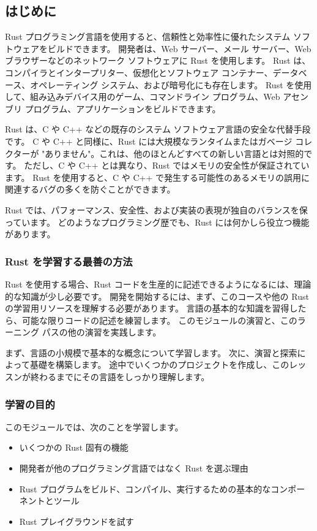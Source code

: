 \subsection{はじめに}

Rust プログラミング言語を使用すると、信頼性と効率性に優れたシステム ソフトウェアをビルドできます。 開発者は、Web サーバー、メール サーバー、Web ブラウザーなどのネットワーク ソフトウェアに Rust を使用します。 Rust は、コンパイラとインタープリター、仮想化とソフトウェア コンテナー、データベース、オペレーティング システム、および暗号化にも存在します。 Rust を使用して、組み込みデバイス用のゲーム、コマンドライン プログラム、Web アセンブリ プログラム、アプリケーションをビルドできます。

Rust は、C や C++ などの既存のシステム ソフトウェア言語の安全な代替手段です。 C や C++ と同様に、Rust には大規模なランタイムまたはガベージ コレクターが "ありません"。これは、他のほとんどすべての新しい言語とは対照的です。 ただし、C や C++ とは異なり、Rust ではメモリの安全性が保証されています。 Rust を使用すると、C や C++ で発生する可能性のあるメモリの誤用に関連するバグの多くを防ぐことができます。

Rust では、パフォーマンス、安全性、および実装の表現が独自のバランスを保っています。 どのようなプログラミング歴でも、Rust には何かしら役立つ機能があります。

\subsubsection{Rust を学習する最善の方法}

Rust を使用する場合、Rust コードを生産的に記述できるようになるには、理論的な知識が少し必要です。 開発を開始するには、まず、このコースや他の Rust の学習用リソースを理解する必要があります。 言語の基本的な知識を習得したら、可能な限りコードの記述を練習します。 このモジュールの演習と、このラーニング パスの他の演習を実践します。

まず、言語の小規模で基本的な概念について学習します。 次に、演習と探索によって基礎を構築します。 途中でいくつかのプロジェクトを作成し、このレッスンが終わるまでにその言語をしっかり理解します。

\subsubsection{学習の目的}

このモジュールでは、次のことを学習します。

\begin{itemize}
\item いくつかの Rust 固有の機能
\item 開発者が他のプログラミング言語ではなく Rust を選ぶ理由
\item Rust プログラムをビルド、コンパイル、実行するための基本的なコンポーネントとツール
\item Rust プレイグラウンドを試す
\end{itemize}
